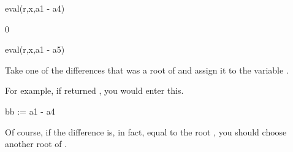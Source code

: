 {{{{{{{{{{{{{{{{{{\begin{xtc}
\begin{xtccomment}
\end{xtccomment}
\begin{spadsrc}
eval(r,x,a1 - a4) 
\end{spadsrc}
\begin{TeXOutput}
\begin{fricasmath}{16}
0%
\end{fricasmath}
\end{TeXOutput}
\end{xtc}
\begin{xtc}
\begin{xtccomment}
\end{xtccomment}
\begin{spadsrc}
eval(r,x,a1 - a5) 
\end{spadsrc}
\begin{TeXOutput}
\begin{fricasmath}{17}
%
\end{fricasmath}
\end{TeXOutput}
\end{xtc}
%

Take one of the differences that was a root of 
and assign it to the variable .
\begin{xtc}
\begin{xtccomment}
For example, if  returned , you would
enter this.
\end{xtccomment}
\begin{spadsrc}
bb := a1 - a4 
\end{spadsrc}
\begin{TeXOutput}
\begin{fricasmath}{18}
%
\end{fricasmath}
\end{TeXOutput}
\end{xtc}
Of course, if the difference is, in fact, equal to the root ,
you should choose another root of .

}}}}}}}}}}}}}}}}}}
